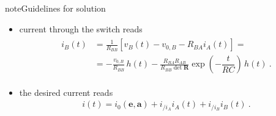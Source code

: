 \documentclass[letterpaper,10pt,italian]{jupyterBook}
\begin{document}
\begin{sphinxadmonition}{note}{Guidelines for solution}
\begin{itemize}
\item {} 
\sphinxAtStartPar
current through the switch reads
\begin{equation*}
\begin{split}\begin{aligned}
     i_B(t)
     & = \frac{1}{R_{BB}} \left[ v_B(t) - v_{0,B} - R_{BA} i_A(t) \right] = \\
     & = - \frac{v_{0,B}}{R_{BB}} \, h(t) - \frac{R_{BA} R_{AB}}{R_{BB} \det \mathbf{R} } \exp \left( -\dfrac{t}{RC} \right) \, h(t) \ .
   \end{aligned}\end{split}
\end{equation*}
\item {} 
\sphinxAtStartPar
the desired current reads
\begin{equation*}
\begin{split}i(t) = i_0(\mathbf{e}, \mathbf{a}) + i_{/i_A} i_A(t) + i_{/i_B} i_B(t) \ .\end{split}
\end{equation*}
\end{itemize}
\end{sphinxadmonition}


 \label{exercise:exam-25-02-11-exe-01}
\end{document}
